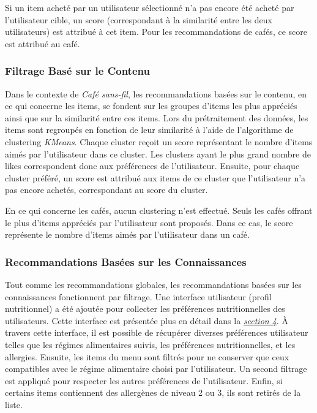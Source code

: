 \documentclass[11pt]{article}
\begin{document}
Si un item acheté par un utilisateur sélectionné n'a pas encore été acheté par l'utilisateur cible, un score (correspondant à la similarité entre les deux utilisateurs) est attribué à cet item. Pour les recommandations de cafés, ce score est attribué au café.

\subsubsection{Filtrage Basé sur le Contenu}
Dans le contexte de \textit{Café sans-fil}, les recommandations basées sur le contenu, en ce qui concerne les items, se fondent sur les groupes d'items les plus appréciés ainsi que sur la similarité entre ces items. Lors du prétraitement des données, les items sont regroupés en fonction de leur similarité à l'aide de l'algorithme de clustering \textit{KMeans}. Chaque cluster reçoit un score représentant le nombre d'items aimés par l'utilisateur dans ce cluster. Les clusters ayant le plus grand nombre de likes correspondent donc aux préférences de l'utilisateur. Ensuite, pour chaque cluster préféré, un score est attribué aux items de ce cluster que l'utilisateur n'a pas encore achetés, correspondant au score du cluster.\

En ce qui concerne les cafés, aucun clustering n'est effectué. Seuls les cafés offrant le plus d'items appréciés par l'utilisateur sont proposés. Dans ce cas, le score représente le nombre d'items aimés par l'utilisateur dans un café.

\subsubsection{Recommandations Basées sur les Connaissances}
Tout comme les recommandations globales, les recommandations basées sur les connaissances fonctionnent par filtrage. Une interface utilisateur (profil nutritionnel) a été ajoutée pour collecter les préférences nutritionnelles des utilisateurs. Cette interface est présentée plus en détail dans la \hyperref[implementation]{\textit{section 4}}. À travers cette interface, il est possible de récupérer diverses préférences utilisateur telles que les régimes alimentaires suivis, les préférences nutritionnelles, et les allergies. Ensuite, les items du menu sont filtrés pour ne conserver que ceux compatibles avec le régime alimentaire choisi par l'utilisateur. Un second filtrage est appliqué pour respecter les autres préférences de l'utilisateur. Enfin, si certains items contiennent des allergènes de niveau 2 ou 3, ils sont retirés de la liste.
\end{document}
